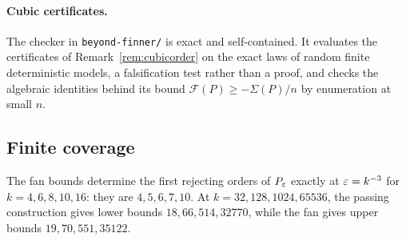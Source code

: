 \paragraph{Cubic certificates.}
The checker in \texttt{beyond-finner/} is exact and self-contained. It evaluates the certificates of Remark~\ref{rem:cubicorder} on the exact laws of random finite deterministic models, a falsification test rather than a proof, and checks the algebraic identities behind its bound $\mathcal F(P)\ge-\Sigma(P)/n$ by enumeration at small $n$.

\subsection{Finite coverage}

The fan bounds determine the first rejecting orders of $P_\varepsilon$ exactly at $\varepsilon=k^{-3}$ for $k=4,6,8,10,16$: they are $4,5,6,7,10$. At $k=32,128,1024,65536$, the passing construction gives lower bounds $18,66,514,32770$, while the fan gives upper bounds $19,70,551,35122$.

